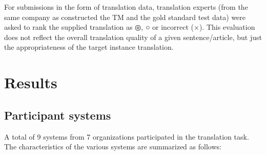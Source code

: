For submissions in the form of translation data, translation experts
(from the same company as constructed the TM and the gold standard test
data) were asked to rank the supplied translation as ◎, ○ or incorrect
(×).  This evaluation does not reflect the overall translation quality
of a given sentence/article, but just the appropriateness of the target
instance translation.


\vspace*{.6em}

\section{Results}


\subsection{Participant systems}

A total of 9 systems from 7 organizations participated in the
translation task.  The characteristics of the various systems are
summarized as follows:

